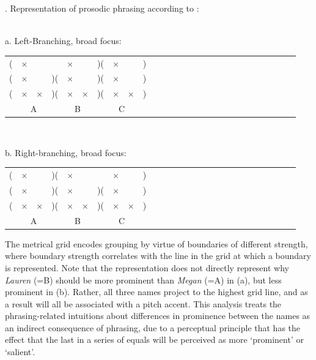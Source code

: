 \documentclass[preprint,review,12pt,authoryear,times]{elsarticle}
\newcommand{\g}{$\times$}
\begin{document}
\ex. Representation of prosodic phrasing according to  \citet{wagner05recursion,wagner10nllt}:\\\label{phraspromYo}
\vspace{-10pt}
\ \\
\parbox{2in}{\footnotesize a. Left-Branching, broad focus:\\
\vspace{-12pt}
\setlength{\unitlength}{1cm}
\setlength\extrarowheight{-3pt}
 \begin{tabular}{ccccccccccccccccccccccccccc}
(&\g&&&\g&&)(&\g&&)&\\
(&\g&&)(&\g&&)(&\g&&)&\\
(&\g&\g&)(&\g&\g&)(&\g&\g&)&\\
\multicolumn{4}{c}{A}&\multicolumn{2}{c}{B}&\multicolumn{4}{c}{C}\\
\end{tabular}
}\parbox{0,45in}{\ }\parbox{2in}{\footnotesize b. Right-branching, broad focus:\\
\vspace{-12pt}
\setlength{\unitlength}{1cm}
\setlength\extrarowheight{-3pt}
\begin{tabular}{ccccccccccccccccccccccccccc}
(&\g&&)(&\g&&&\g&&)&\\
(&\g&&)(&\g&&)(&\g&&)&\\
(&\g&\g&)(&\g&\g&)(&\g&\g&)&\\
\multicolumn{4}{c}{A}&\multicolumn{2}{c}{B}&\multicolumn{4}{c}{C}\\
\end{tabular}
}\label{libhi}


\noindent The metrical grid encodes grouping by virtue of boundaries of different strength, where boundary strength correlates with the line in the grid at which a boundary is represented. Note that the representation does not directly represent why {\em Lauren} (=B) should be more prominent than {\em Megan} (=A)  in (a), but less  prominent in (b). Rather, all three names project to the highest grid line, and as a result will all be associated with a pitch accent. This analysis treats the phrasing-related intuitions about differences in prominence between the names as an indirect consequence of phrasing, due to a perceptual principle that has the effect that the last in a series of equals will be perceived as more `prominent' or `salient'. 
\end{document}
